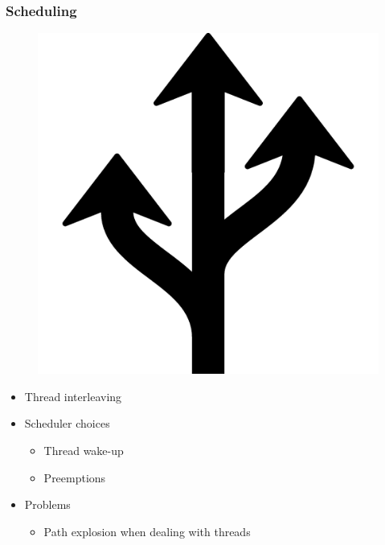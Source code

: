 \documentclass{beamer}
\begin{document}
	\begin{frame}
		\frametitle{Scheduling}
		
		\begin{figure}[htbp]
			\centering
			\includegraphics[scale=0.1]{schedule}
		\end{figure}
		
		\begin{itemize}
			\item Thread interleaving
			\item Scheduler choices
			\begin{itemize}
				\item Thread wake-up
				\item Preemptions
			\end{itemize}
			\item Problems
			\begin{itemize}
				\item Path explosion when dealing with threads
			\end{itemize}
		\end{itemize}
	\end{frame}
	
\end{document}
